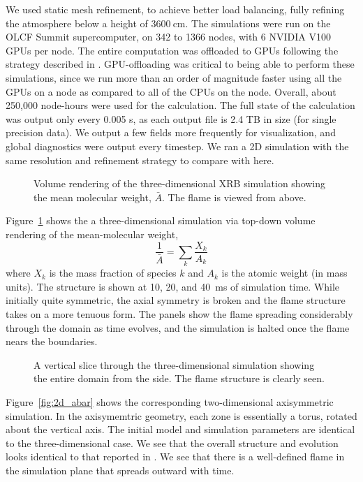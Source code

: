 \documentclass[twocolumn,times,tighten]{aastex631}
\begin{document}
We used static mesh refinement, to achieve better load balancing,
fully refining the atmosphere below a height of $3600~\mathrm{cm}$.
The simulations were run on the OLCF Summit supercomputer, on 342 to
1366 nodes, with 6 NVIDIA V100 GPUs per node.  The entire computation
was offloaded to GPUs following the strategy described in
\citet{castro_gpu}.  GPU-offloading was critical to being able to
perform these simulations, since we run more than an order of
magnitude faster using all the GPUs on a node as compared to all of
the CPUs on the node.  Overall, about 250,000 node-hours were used for
the calculation.  The full state of the calculation was output only
every 0.005 s, as each output file is 2.4 TB in size (for single
precision data).  We output a few fields more frequently for
visualization, and global diagnostics were output every timestep.  We
ran a 2D simulation with the same resolution and refinement strategy
to compare with here.

\begin{figure}[t]
\centering
\caption{\label{fig:vr_abar} Volume rendering of the three-dimensional XRB
simulation showing the mean molecular weight, $\bar{A}$.  The flame is viewed
from above.}
\end{figure}

Figure~\ref{fig:vr_abar} shows the a three-dimensional simulation via
top-down volume rendering of the mean-molecular weight,
\begin{equation}
\frac{1}{\bar{A}} = \sum_k \frac{X_k}{A_k}
\end{equation}
where $X_k$ is the mass fraction of species $k$ and $A_k$ is the
atomic weight (in mass units).  The structure is shown at 10, 20, and
40~ms of simulation time.  While initially quite symmetric, the axial
symmetry is broken and the flame structure takes on a more tenuous
form.  The panels show the flame spreading considerably through the
domain as time evolves, and the simulation is halted once the flame
nears the boundaries.  

\begin{figure*}[t]
\centering
\caption{\label{fig:3dslice} A vertical slice through the three-dimensional
simulation showing the entire domain from the side.  The flame structure
is clearly seen.}
\end{figure*}


Figure~\ref{fig:2d_abar} shows the corresponding two-dimensional
axisymmetric simulation.  In the axisymemtric geometry, each zone is essentially
a torus, rotated about the vertical axis.  The initial model and simulation parameters
are identical to the three-dimensional case.  We see that
the overall structure and evolution looks identical to that reported
in \cite{harpole:2021}.  We see that there is a well-defined flame in the simulation plane
that spreads outward with time.
\end{document}
